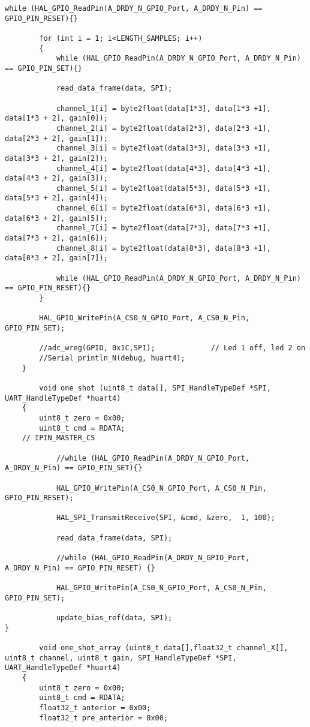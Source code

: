 \begin{lstlisting}[label=algoritmo:STM32F4:ADS1299.c,style = STM-code,frame=single,caption=STM32F4:ADS1299.c]
		while (HAL_GPIO_ReadPin(A_DRDY_N_GPIO_Port, A_DRDY_N_Pin) == GPIO_PIN_RESET){}
			
		for (int i = 1; i<LENGTH_SAMPLES; i++)
		{
			while (HAL_GPIO_ReadPin(A_DRDY_N_GPIO_Port, A_DRDY_N_Pin) == GPIO_PIN_SET){}
			
			read_data_frame(data, SPI);

			channel_1[i] = byte2float(data[1*3], data[1*3 +1], data[1*3 + 2], gain[0]);
			channel_2[i] = byte2float(data[2*3], data[2*3 +1], data[2*3 + 2], gain[1]);
			channel_3[i] = byte2float(data[3*3], data[3*3 +1], data[3*3 + 2], gain[2]);
			channel_4[i] = byte2float(data[4*3], data[4*3 +1], data[4*3 + 2], gain[3]);
			channel_5[i] = byte2float(data[5*3], data[5*3 +1], data[5*3 + 2], gain[4]);
			channel_6[i] = byte2float(data[6*3], data[6*3 +1], data[6*3 + 2], gain[5]);
			channel_7[i] = byte2float(data[7*3], data[7*3 +1], data[7*3 + 2], gain[6]);
			channel_8[i] = byte2float(data[8*3], data[8*3 +1], data[8*3 + 2], gain[7]);
				
			while (HAL_GPIO_ReadPin(A_DRDY_N_GPIO_Port, A_DRDY_N_Pin) == GPIO_PIN_RESET){}
		}
		
		HAL_GPIO_WritePin(A_CS0_N_GPIO_Port, A_CS0_N_Pin, GPIO_PIN_SET);
		
		//adc_wreg(GPIO, 0x1C,SPI);				// Led 1 off, led 2 on					
		//Serial_println_N(debug, huart4);
	}
	
		void one_shot (uint8_t data[], SPI_HandleTypeDef *SPI, UART_HandleTypeDef *huart4)
	{
		uint8_t zero = 0x00;
		uint8_t cmd = RDATA;
	// IPIN_MASTER_CS	
		
			//while (HAL_GPIO_ReadPin(A_DRDY_N_GPIO_Port, A_DRDY_N_Pin) == GPIO_PIN_SET){}
		
			HAL_GPIO_WritePin(A_CS0_N_GPIO_Port, A_CS0_N_Pin, GPIO_PIN_RESET);
			
			HAL_SPI_TransmitReceive(SPI, &cmd, &zero,  1, 100);
		
			read_data_frame(data, SPI);
			
			//while (HAL_GPIO_ReadPin(A_DRDY_N_GPIO_Port, A_DRDY_N_Pin) == GPIO_PIN_RESET) {}			
				
			HAL_GPIO_WritePin(A_CS0_N_GPIO_Port, A_CS0_N_Pin, GPIO_PIN_SET);

			update_bias_ref(data, SPI);
}
	
		void one_shot_array (uint8_t data[],float32_t channel_X[], uint8_t channel, uint8_t gain, SPI_HandleTypeDef *SPI, UART_HandleTypeDef *huart4)
	{
		uint8_t zero = 0x00;
		uint8_t cmd = RDATA;
		float32_t anterior = 0x00;
		float32_t pre_anterior = 0x00;
		

\end{lstlisting}
